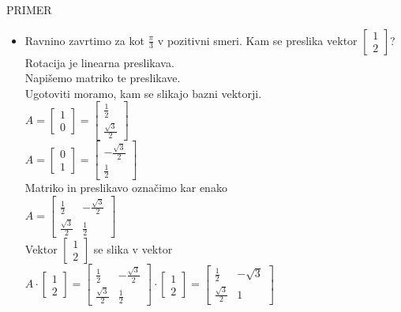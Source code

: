 \documentclass[a4paper,12pt]{article}
\begin{document}
PRIMER
\begin{itemize}
	\item Ravnino zavrtimo za kot $\frac{\pi}{3}$ v pozitivni smeri. Kam se preslika vektor $\begin{bmatrix}
		1 \\ 2
	\end{bmatrix}$?\\

	Rotacija je linearna preslikava. \\

	Napišemo matriko te preslikave.\\

	Ugotoviti moramo, kam se slikajo bazni vektorji. \\

$A=\begin{bmatrix} 1 \\ 0 \end{bmatrix} = \begin{bmatrix} \frac{1}{2}
\\ \frac{\sqrt{3}}{2} \end{bmatrix}$ \\

$A=\begin{bmatrix} 0 \\ 1 \end{bmatrix} = \begin{bmatrix} -\frac{\sqrt{3}}{2} \\ \frac{1}{2} \end{bmatrix}$ \\

	Matriko in preslikavo označimo kar enako \\

	$A=\begin{bmatrix}
		\frac{1}{2} & -\frac{\sqrt{3}}{2} \\
		\frac{\sqrt{3}}{2} & \frac{1}{2}
	\end{bmatrix}$ \\

Vektor $\begin{bmatrix} 1 \\ 2 \end{bmatrix}$ se slika v vektor $A\cdot \begin{bmatrix} 1 \\ 2 \end{bmatrix} = \begin{bmatrix}
	\frac{1}{2} & -\frac{\sqrt{3}}{2} \\
	\frac{\sqrt{3}}{2} & \frac{1}{2}
\end{bmatrix} \cdot \begin{bmatrix} 1 \\ 2 \end{bmatrix} = \begin{bmatrix}
	\frac{1}{2} & -\sqrt{3} \\
	\frac{\sqrt{3}}{2} & 1
\end{bmatrix}$ \\
\end{itemize}
\end{document}
